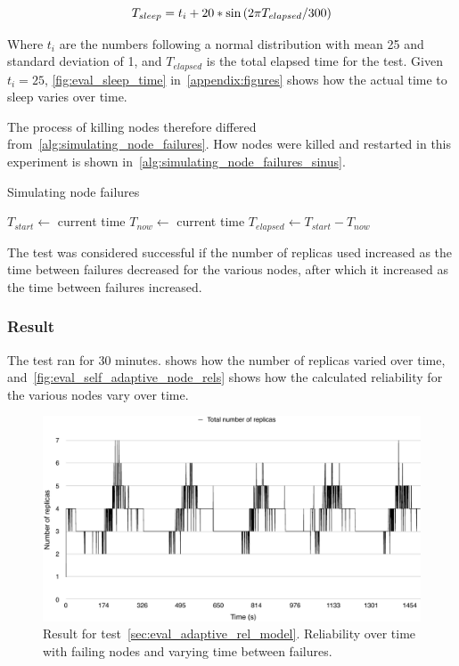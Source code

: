 \documentclass{cslthse-msc}
\begin{document}
\begin{equation} \label{eq:eval_sleep_time}
T_{sleep} = t_i + 20 * \sin{(2\*\pi\*T_{elapsed} / 300)}
\end{equation}

Where $t_i$ are the numbers following a normal distribution with mean 25 and standard deviation of 1, and $T_{elapsed}$ is the total elapsed time for the test. Given $t_i=25$, \cref{fig:eval_sleep_time} in~\cref{appendix:figures} shows how the actual time to sleep varies over time.

The process of killing nodes therefore differed from~\cref{alg:simulating_node_failures}. How nodes were killed and restarted in this experiment is shown in~\cref{alg:simulating_node_failures_sinus}.

\begin{algorithm} 
	\caption{Simulating node failures} \label{alg:simulating_node_failures_sinus}
	\begin{algorithmic}[1]
	\State $T_{start}\gets$ current time
		\State
		\State $T_{now}\gets$ current time
		\State $T_{elapsed}\gets T_{start}-T_{now}$
		\State
		\State
	\EndWhile
	\end{algorithmic}
\end{algorithm}

The test was considered successful if the number of replicas used increased as the time between failures decreased for the various nodes, after which it increased as the time between failures increased.

\subsubsection*{Result}
The test ran for 30 minutes.  shows how the number of replicas varied over time, and~\cref{fig:eval_self_adaptive_node_rels} shows how the calculated reliability for the various nodes vary over time. 

\begin{figure}[!hbt]
\centering
\includegraphics[scale=0.5]{images/results/self_adaptive_replicas.pdf}
\caption{Result for test~\ref{sec:eval_adaptive_rel_model}. Reliability over time with failing nodes and varying time between failures.} \label{fig:eval_self_adaptive_rel}
\end{figure}
\end{document}
